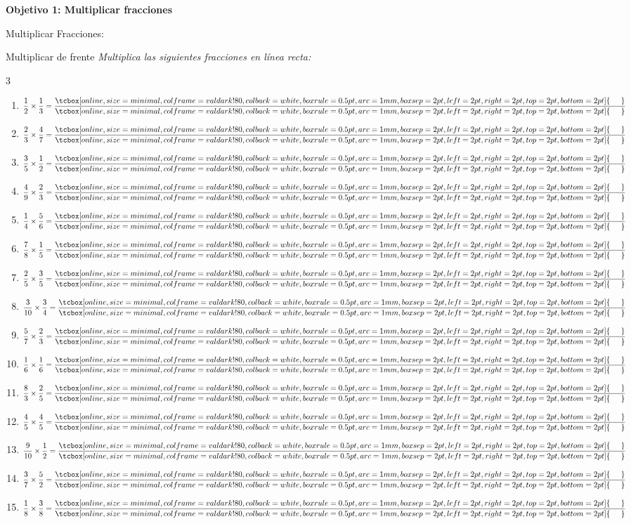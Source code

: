 \documentclass[12pt, letterpaper]{article}
\newenvironment{objetivo}[1]{%
    \begin{tcolorbox}[colback=valblue!10, colframe=valblue, arc=2mm, boxrule=1.5pt]
        {\large\bfseries \ding{118} #1}
    \end{tcolorbox}
}{}
\newcommand{\boxfill}[1][0.8cm]{\tcbox[on line, size=minimal, colframe=valdark!80, colback=white, boxrule=0.5pt, arc=1mm, boxsep=2pt, left=2pt, right=2pt, top=2pt, bottom=2pt]{\makebox[#1]{\vphantom{M}}}}
\begin{document}
\begin{objetivo}{Objetivo 1: Multiplicar fracciones}
\begin{concepto}{Multiplicar Fracciones:}
\end{concepto}

\vspace{0.6cm}
    \begin{practica}{Multiplicar de frente}
        \textit{Multiplica las siguientes fracciones en línea recta:}
        \vspace{0.2cm}
        \begin{multicols}{3}
            \raggedcolumns
            \begin{enumerate}[itemsep=0.4cm]
                \item $\dfrac{1}{2} \times \dfrac{1}{3} = \dfrac{\boxfill[0.5cm]}{\boxfill[0.5cm]}$
                \item $\dfrac{2}{3} \times \dfrac{4}{7} = \dfrac{\boxfill[0.5cm]}{\boxfill[0.5cm]}$
                \item $\dfrac{3}{5} \times \dfrac{1}{2} = \dfrac{\boxfill[0.5cm]}{\boxfill[0.5cm]}$
                \item $\dfrac{4}{9} \times \dfrac{2}{3} = \dfrac{\boxfill[0.5cm]}{\boxfill[0.5cm]}$
                \item $\dfrac{1}{4} \times \dfrac{5}{6} = \dfrac{\boxfill[0.5cm]}{\boxfill[0.5cm]}$
                \item $\dfrac{7}{8} \times \dfrac{1}{5} = \dfrac{\boxfill[0.5cm]}{\boxfill[0.5cm]}$
                \item $\dfrac{2}{5} \times \dfrac{3}{5} = \dfrac{\boxfill[0.5cm]}{\boxfill[0.5cm]}$
                \item $\dfrac{3}{10} \times \dfrac{3}{4} = \dfrac{\boxfill[0.5cm]}{\boxfill[0.5cm]}$
                \item $\dfrac{5}{7} \times \dfrac{2}{3} = \dfrac{\boxfill[0.5cm]}{\boxfill[0.5cm]}$
                \item $\dfrac{1}{6} \times \dfrac{1}{6} = \dfrac{\boxfill[0.5cm]}{\boxfill[0.5cm]}$
                \item $\dfrac{8}{3} \times \dfrac{2}{5} = \dfrac{\boxfill[0.5cm]}{\boxfill[0.5cm]}$
                \item $\dfrac{4}{5} \times \dfrac{4}{5} = \dfrac{\boxfill[0.5cm]}{\boxfill[0.5cm]}$
                \item $\dfrac{9}{10} \times \dfrac{1}{2} = \dfrac{\boxfill[0.5cm]}{\boxfill[0.5cm]}$
                \item $\dfrac{3}{7} \times \dfrac{5}{2} = \dfrac{\boxfill[0.5cm]}{\boxfill[0.5cm]}$
                \item $\dfrac{1}{8} \times \dfrac{3}{8} = \dfrac{\boxfill[0.5cm]}{\boxfill[0.5cm]}$
            \end{enumerate}
        \end{multicols}
    \end{practica}
\end{objetivo}
\end{document}
